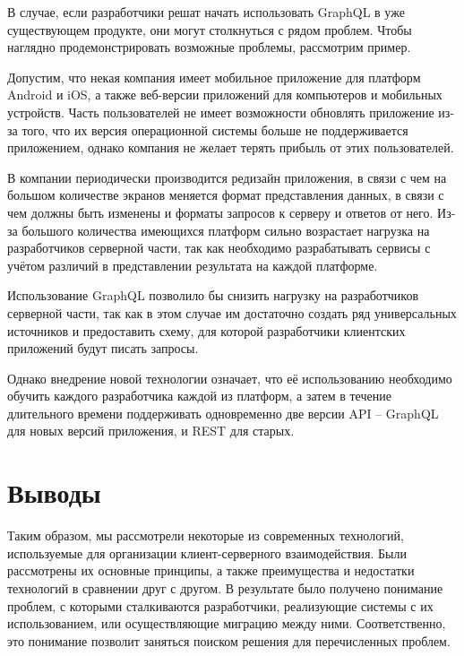 В случае, если разработчики решат начать использовать GraphQL в уже существующем продукте, они могут столкнуться с рядом проблем.
Чтобы наглядно продемонстрировать возможные проблемы, рассмотрим пример.

Допустим, что некая компания имеет мобильное приложение для платформ Android и iOS, а также веб-версии приложений для компьютеров и мобильных устройств.
Часть пользователей не имеет возможности обновлять приложение из-за того, что их версия операционной системы больше не поддерживается приложением, однако компания не желает терять прибыль от этих пользователей.

В компании периодически производится редизайн приложения, в связи с чем на большом количестве экранов меняется формат представления данных, в связи с чем должны быть изменены и форматы запросов к серверу и ответов от него.
Из-за большого количества имеющихся платформ сильно возрастает нагрузка на разработчиков серверной части, так как необходимо разрабатывать сервисы с учётом различий в представлении результата на каждой платформе.

Использование GraphQL позволило бы снизить нагрузку на разработчиков серверной части, так как в этом случае им достаточно создать ряд универсальных источников и предоставить схему, для которой разработчики клиентских приложений будут писать запросы.

Однако внедрение новой технологии означает, что её использованию необходимо обучить каждого разработчика каждой из платформ, а затем в течение длительного времени поддерживать одновременно две версии API – GraphQL для новых версий приложения, и REST для старых.


\section{Выводы} \label{sec:conclusion}

Таким образом, мы рассмотрели некоторые из современных технологий, используемые для организации клиент-серверного взаимодействия.
Были рассмотрены их основные принципы, а также преимущества и недостатки технологий в сравнении друг с другом.
В результате было получено понимание проблем, с которыми сталкиваются разработчики, реализующие системы с их использованием, или осуществляющие миграцию между ними.
Соответственно, это понимание позволит заняться поиском решения для перечисленных проблем.